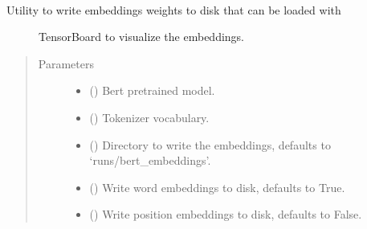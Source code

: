 \documentclass[letterpaper,10pt,english]{sphinxmanual}
\begin{document}
\begin{fulllineitems}
\label{\detokenize{code:code_utils.plotter.write_embeddings_to_disk}}~\begin{description}
\item[{Utility to write embeddings weights to disk that can be loaded with}] \leavevmode
TensorBoard to visualize the embeddings.

\end{description}
\begin{quote}\begin{description}
\item[{Parameters}] \leavevmode\begin{itemize}
\item {} 
 () \textendash{} Bert pretrained model.

\item {} 
 () \textendash{} Tokenizer vocabulary.

\item {} 
 (\sphinxstyleliteralemphasis{\sphinxupquote{, }}) \textendash{} Directory to write the embeddings, defaults to 
‘runs/bert\_embeddings’.

\item {} 
 (\sphinxstyleliteralemphasis{\sphinxupquote{, }}) \textendash{} Write word embeddings to disk, defaults
to True.

\item {} 
 (\sphinxstyleliteralemphasis{\sphinxupquote{, }}) \textendash{} Write position embeddings to disk,
defaults to False.


\end{itemize}
\end{description}
\end{quote}
\end{fulllineitems}
\end{document}
